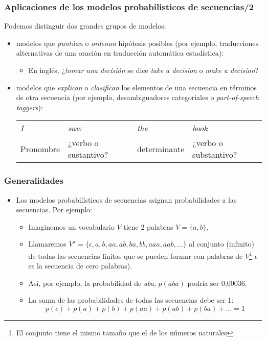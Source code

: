 \begin{frame}
  \frametitle{Aplicaciones de los modelos probabilisticos de secuencias/2}

Podemos distinguir dos grandes grupos de modelos:
\begin{itemize}
\item modelos que \emph{puntúan} o \emph{ordenan} hipótesis posibles (por ejemplo, traducciones alternativas de una oración en traducción automática estadística):
  \begin{itemize}
  \item En inglés, ¿\emph{tomar una decisión} se dice \emph{take a decision} o \emph{make a decision}?
  \end{itemize}
\item modelos que \emph{explican} o \emph{clasifican} los elementos de una secuencia en términos de otra secuencia (por ejemplo, desambiguadores categoriales o \emph{part-of-speech taggers}):
  \begin{tabular}{p{2cm}p{2cm}p{2cm}p{2cm}}
\emph{I} 	&\emph{saw} 	&\emph{the} 	&\emph{book}\\
Pronombre	&¿verbo o sustantivo? &determinante &¿verbo o substantivo?\\
   \end{tabular}
\end{itemize}


\end{frame}
\begin{frame}
  \frametitle{Generalidades}
  \begin{itemize}
  \item Los modelos probabilísticos de secuencias asignan probabilidades a las secuencias. Por ejemplo:
    \begin{itemize}
    \item Imaginemos un  vocabulario \(V\) tiene 2 palabras \(V=\{a,b\}\).
    \item Llamaremos
      \(V^\star=\{\epsilon,a,b,aa,ab,ba,bb,aaa,aab,\ldots\}\)
      al conjunto (infinito) de todas las secuencias finitas que se
      pueden formar con palabras de \(V\)\footnote{El conjunto tiene el mismo tamaño que el de los números naturales}  \(\epsilon\) es la secuencia de cero palabras).
    \item Así, por ejemplo, la probabilidad de \emph{aba}, \(p(aba)\)
      podría ser 0,00036.
    \item La suma de las probabilidades de todas las secuencias debe ser 1:
\[p(\epsilon)+p(a)+p(b)+p(aa)+p(ab)+p(ba)+\ldots = 1\]
    \end{itemize}
  \end{itemize}

\end{frame}


